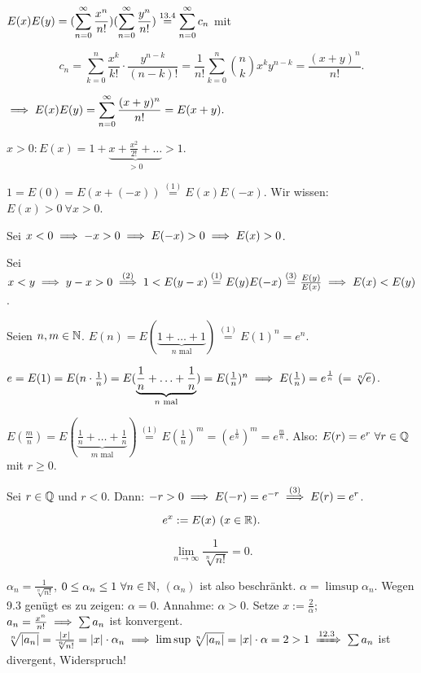\documentclass[a4paper,oneside,DIV15,BCOR12mm]{scrbook}
\begin{document}
\begin{beweise}
\item $\displaystyle{E(x)E(y) = (\sum_{n=0}^{\infty}{\frac{x^n}{n!}})(\sum_{n=0}^{\infty}{\frac{y^n}{n!}}) \overset{\text{13.4}}{=} \sum_{n=0}^{\infty}{c_n}}$ mit

$$c_n = \sum_{k=0}^{n}{\frac{x^k}{k!}\cdot\frac{y^{n-k}}{(n-k)!}} = \frac{1}{n!} \sum_{k=0}^{n}{\binom{n}{k} x^k y^{n-k}} = \frac{(x+y)^n}{n!}.$$

$\displaystyle{\ensuremath{\implies}E(x)E(y) = \sum_{n=0}^{\infty}{\frac{(x+y)^n}{n!}} = E(x+y).}$

\item $x>0: E(x) = 1+\underbrace{x+\frac{x^2}{2!}+\ldots}_{>0} > 1$.

\item $1 = E(0) = E(x+(-x)) \overset{(1)}{=} E(x)E(-x)$. Wir wissen: $E(x)>0\ \forall x>0$.

Sei $x<0 \implies -x>0 \implies E(-x)>0 \implies E(x)>0$.

\item Sei $x<y \implies y-x>0 \overset{(2)}{\implies} 1<E(y-x) \overset{(1)}{=} E(y)E(-x) \overset{(3)}{=} \frac{E(y)}{E(x)} \implies E(x)<E(y)$.

\item Seien $n,m\in\mathbb{N}$. $E(n) = E(\underbrace{1+\ldots+1}_{n\text{ mal}}) \overset{(1)}{=} E(1)^n = e^n$.

$e = E(1) = E(n\cdot\frac{1}{n}) = E(\underbrace{\frac{1}{n}+\ldots+\frac{1}{n}}_{n\text{ mal}}) = E(\frac{1}{n})^n \implies E(\frac{1}{n}) = e^{\frac{1}{n}}\ (= \sqrt[n]{e})$.

$E(\frac{m}{n}) = E(\underbrace{\frac{1}{n}+\ldots+\frac{1}{n}}_{m\text{ mal}}) \overset{(1)}{=} E(\frac{1}{n})^m = (e^{\frac{1}{n}})^m = e^{\frac{m}{n}}$. Also: $E(r) = e^r\ \forall r\in\mathbb{Q}$ mit $r \ge 0$.

Sei $r\in\mathbb{Q}$ und $r<0$. Dann: $-r>0 \implies E(-r) = e^{-r} \overset{(3)}{\implies} E(r) = e^r$.
\end{beweise}

\begin{definition}[$e^x$]
\begin{equation*}
e^x := E(x)\ (x\in\mathbb{R}).
\end{equation*}
\end{definition}

\begin{wichtigerhilfssatz}
$$\lim_{n\to\infty}{\frac{1}{\sqrt[n]{n!}}} = 0.$$
\end{wichtigerhilfssatz}

\begin{beweis}
$\alpha_n = \frac{1}{\sqrt[n]{n!}}$, $0\le \alpha_n \le 1 \ \forall n\in\mathbb{N}$, $(\alpha_n)$ ist also beschränkt.
$\alpha = \limsup \alpha_n$. Wegen 9.3 genügt es zu zeigen: $\alpha = 0$. Annahme: $\alpha > 0$. Setze $x:= \frac{2}{\alpha}$; $a_n = \frac{x^n}{n!} \implies \sum{a_n}$ ist konvergent. $\sqrt[n]{|a_n|} = \frac{|x|}{\sqrt[n]{n!}} = |x|\cdot\alpha_n \folgt \limsup \sqrt[n]{|a_n|} = |x|\cdot\alpha = 2>1 \folgtnach{12.3} \sum{a_n}$ ist divergent, Widerspruch!
\end{beweis}
\end{document}
